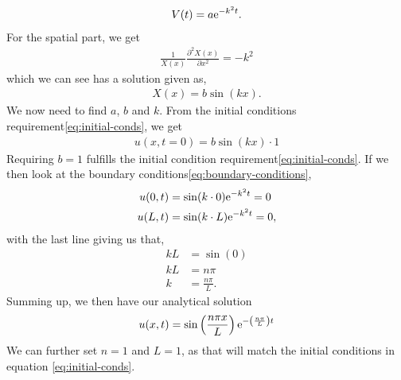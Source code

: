 \begin{align*}
    V(t) = a \mathrm{e}^{-k^2t}.
\end{align*}
For the spatial part, we get
\begin{align}
    \frac{1}{X(x)}\frac{\partial^2 X(x)}{\partial x^2} = -k^2
    \label{eq:pde-temporal-general}
\end{align}
which we can see has a solution given as\cite{boas_mathematical_2006},
\begin{align}
    X(x) = b\sin(kx).
    \label{eq:pde-spatial-general}
\end{align}
We now need to find $a$, $b$ and $k$. From the initial conditions requirement\eqref{eq:initial-conds}, we get
\begin{align*}
    u(x,t=0) = b\sin(kx) \cdot 1
\end{align*}
Requiring $b=1$ fulfills the initial condition requirement\eqref{eq:initial-conds}. If we then look at the boundary conditions\eqref{eq:boundary-conditions},
\begin{align*}
    u(0,t) &= \sin(k\cdot 0)\mathrm{e}^{-k^2t} = 0 \\
    u(L,t) &= \sin(k\cdot L)\mathrm{e}^{-k^2t} = 0,
\end{align*}
with the last line giving us that,
\begin{align*}
    kL &= \sin (0) \\
    kL &= n \pi \\
    k &= \frac{n\pi}{L}.
\end{align*}
Summing up, we then have our analytical solution
\begin{align}
    u(x,t) = \sin\left(\frac{n\pi x}{L}\right)\mathrm{e}^{-\left(\frac{n\pi}{L}\right)t}
    \label{eq:pde-analytical-solution}
\end{align}
We can further set $n=1$ and $L=1$, as that will match the initial conditions in equation \eqref{eq:initial-conds}.

